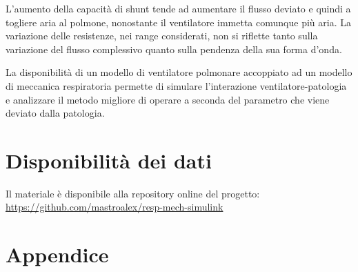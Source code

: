 L'aumento della capacità di shunt tende ad aumentare il flusso deviato e quindi a togliere aria al polmone, nonostante il ventilatore immetta comunque più aria.
La variazione delle resistenze, nei range considerati, non si riflette tanto sulla variazione del flusso complessivo quanto sulla pendenza della sua forma d'onda.

La disponibilità di un modello di ventilatore polmonare accoppiato ad un modello di meccanica respiratoria permette di simulare l'interazione ventilatore-patologia e analizzare il metodo migliore di operare a seconda del parametro che viene deviato dalla patologia. 

\section*{Disponibilità dei dati}

Il materiale è disponibile alla repository online del progetto: \url{https://github.com/mastroalex/resp-mech-simulink}


\raggedbottom
\printbibliography[title=Riferimenti]


\clearpage
\onecolumn
\section*{Appendice}
